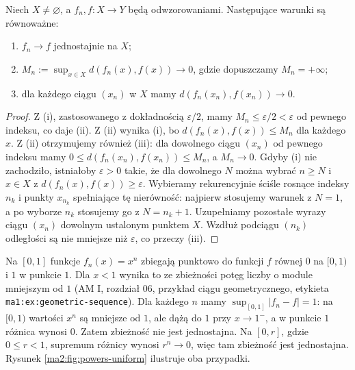 \begin{twierdzenie}
\label{ma2:thm:uniform-criteria}
Niech $X\ne\varnothing$, a $f_n,f:X\to Y$
będą odwzorowaniami. Następujące warunki są równoważne:
\begin{enumerate}[label=(\roman*)]
\item $f_n\to f$ jednostajnie na $X$;
\item $M_n:=\sup_{x\in X}d(f_n(x),f(x))\to0$,
gdzie dopuszczamy $M_n=+\infty$;
\item dla każdego ciągu $(x_n)$ w $X$ mamy
$d(f_n(x_n),f(x_n))\to0$.
\end{enumerate}
\end{twierdzenie}
\begin{proof}
Z (i), zastosowanego z dokładnością $\varepsilon/2$,
mamy $M_n\le\varepsilon/2<\varepsilon$ od pewnego
indeksu, co daje (ii). Z (ii) wynika (i), bo
$d(f_n(x),f(x))\le M_n$ dla każdego $x$.
Z (ii) otrzymujemy również (iii): dla dowolnego
ciągu $(x_n)$ od pewnego indeksu mamy
$0\le d(f_n(x_n),f(x_n))\le M_n$, a $M_n\to0$.
Gdyby (i) nie zachodziło, istniałoby $\varepsilon>0$
takie, że dla dowolnego $N$ można wybrać $n\ge N$
i $x\in X$ z $d(f_n(x),f(x))\ge\varepsilon$.
Wybieramy rekurencyjnie ściśle rosnące indeksy
$n_k$ i punkty $x_{n_k}$ spełniające tę nierówność:
najpierw stosujemy warunek z $N=1$, a po wyborze
$n_k$ stosujemy go z $N=n_k+1$.
Uzupełniamy pozostałe wyrazy ciągu $(x_n)$ dowolnym
ustalonym punktem $X$. Wzdłuż podciągu $(n_k)$
odległości są nie mniejsze niż $\varepsilon$,
co przeczy (iii).
\end{proof}

\begin{przyklad}
\label{ma2:ex:powers-pointwise}
Na $[0,1]$ funkcje $f_n(x)=x^n$ zbiegają punktowo
do funkcji $f$ równej $0$ na $[0,1)$ i $1$ w punkcie $1$.
Dla $x<1$ wynika to ze zbieżności potęg liczby
o module mniejszym od $1$ (AM I, rozdział 06, przykład ciągu geometrycznego,
etykieta \texttt{ma1:ex:geometric-sequence}).
Dla każdego $n$ mamy $\sup_{[0,1]}|f_n-f|=1$:
na $[0,1)$ wartości $x^n$ są mniejsze od $1$,
ale dążą do $1$ przy $x\to1^-$, a w punkcie $1$
różnica wynosi $0$. Zatem zbieżność nie jest
jednostajna. Na $[0,r]$, gdzie $0\le r<1$,
supremum różnicy wynosi $r^n\to0$, więc tam
zbieżność jest jednostajna. Rysunek
\ref{ma2:fig:powers-uniform} ilustruje oba przypadki.
\end{przyklad}

